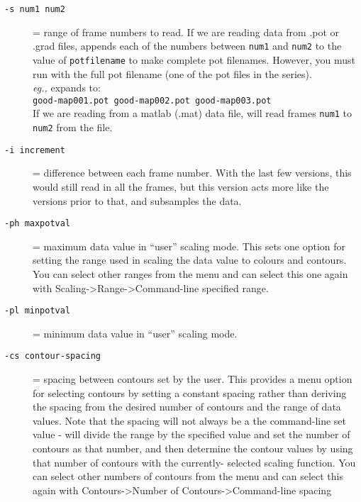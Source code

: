 \begin{description}
  \item[{\tt -s num1 num2}] = range of frame numbers to read.  If we are
    reading data from .pot or .grad files, \map{} appends each of the
    numbers between \texttt{num1} and \texttt{num2} 
    to the value of {\tt potfilename} to make complete pot filenames.
    However, you must run \map{} with the full pot filename (one of the 
    pot files in the series). \\ 
    {\em eg.,} \hspace{.2in}{\tt -p good-map001.pot -s 1 3}\hspace{.2in}
    expands to:\\
    \mbox{\hspace{1in}}
    {\tt good-map001.pot good-map002.pot good-map003.pot}\\
    If we are reading from a matlab (.mat) data file, \map{} will
    read frames {\tt num1} to {\tt num2} from the file.
    
  \item[{\tt-i increment}] = difference between each frame number.
    With the last few versions, this would still read in all the frames, but
    this version acts more like the versions prior to that, and subsamples
    the data.  
    
  \item[{\tt-ph maxpotval}] = maximum data value in ``user'' scaling
    mode.  This sets one option for setting the range used in 
    scaling the data value to colours and contours.  You can select other
    ranges from the menu and can select this one again with
    Scaling->Range->Command-line specified range. 
    
  \item[{\tt-pl minpotval}]
    = minimum data value in ``user'' scaling mode. 
    
  \item[{\tt-cs contour-spacing}] = spacing between contours set by the
    user.  This provides a menu option for selecting contours by setting a
    constant spacing rather than deriving the spacing from the desired
    number of contours and the range of data values.  Note that the spacing
    will not always be a the command-line set value - \map{} will divide
    the range by the specified value and set the number of contours as that
    number, and then determine the contour values by using that number of
    contours with the currently- selected scaling function.  You can select
    other numbers of contours from the menu and can select this again with
    Contours->Number of Contours->Command-line spacing
    

\end{description}
